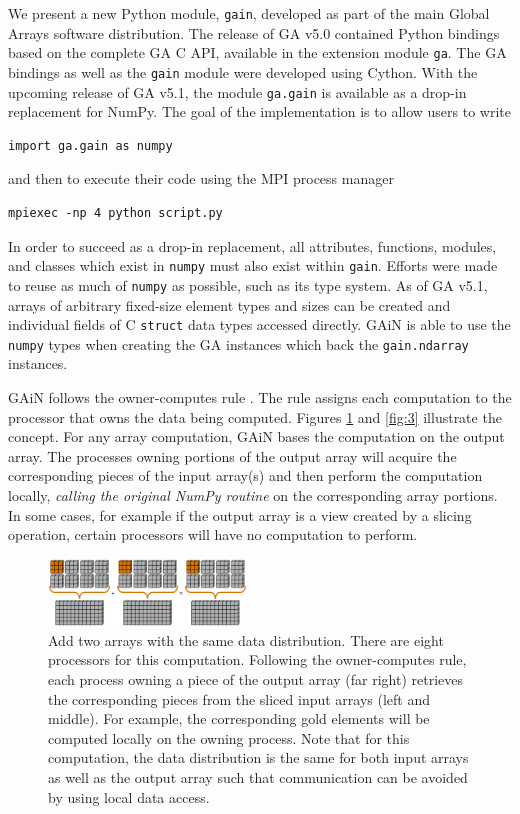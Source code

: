 \documentclass{sigplanconf}
\begin{document}
We present a new Python module, \verb=gain=, developed as part of the main
Global Arrays software distribution. The release of GA v5.0 contained Python
bindings based on the complete GA C API, available in the extension module
\verb=ga=. The GA bindings as well as the \verb=gain= module were developed
using Cython. With the upcoming release of GA v5.1, the module \verb=ga.gain=
is available as a drop-in replacement for NumPy.  The goal of the
implementation is to allow users to write
\begin{verbatim}
import ga.gain as numpy
\end{verbatim}
and then to execute their code using the MPI process manager
\begin{verbatim}
mpiexec -np 4 python script.py
\end{verbatim}

In order to succeed as a drop-in replacement, all attributes, functions,
modules, and classes which exist in \verb=numpy= must also exist within
\verb=gain=.  Efforts were made to reuse as much of \verb=numpy= as possible,
such as its type system. As of GA v5.1, arrays of arbitrary fixed-size element
types and sizes can be created and individual fields of C \verb=struct= data
types accessed directly.  GAiN is able to use the \verb=numpy= types when
creating the GA instances which back the \verb=gain.ndarray= instances.

GAiN follows the owner-computes rule \cite{Zim88}. The rule assigns each
computation to the processor that owns the data being computed. Figures
\ref{fig:2} and \ref{fig:3} illustrate the concept. For any array computation,
GAiN bases the computation on the output array. The processes owning portions
of the output array will acquire the corresponding pieces of the input
array(s) and then perform the computation locally, \emph{calling the original
NumPy routine} on the corresponding array portions. In some cases, for example
if the output array is a view created by a slicing operation, certain
processors will have no computation to perform.

\begin{figure}[htb]
\centering
\includegraphics[width=0.47\textwidth]{image3_crop.eps}
\caption{
Add two arrays with the same data distribution. There are eight processors for
this computation.  Following the owner-computes rule, each process owning a
piece of the output array (far right) retrieves the corresponding pieces from
the sliced input arrays (left and middle). For example, the corresponding gold
elements will be computed locally on the owning process.  Note that for this
computation, the data distribution is the same for both input arrays as well
as the output array such that communication can be avoided by using local data
access.
}
\label{fig:2}
\end{figure}
\end{document}

